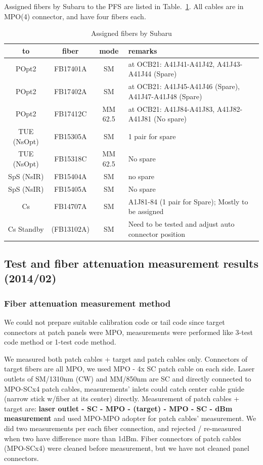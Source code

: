 \documentclass[a4paper,notitlepage]{article}
\begin{document}
Assigned fibers by Subaru to the PFS are listed 
in Table.~\ref{tab:subaru-fiber}.
All cables are in MPO(4) connector, and have four fibers each. 

\begin{table}[htb]
\begin{center}
\caption{Assigned fibers by Subaru}
\label{tab:subaru-fiber}
\begin{tabular}{c|c|c|l}
to & fiber & mode & remarks \\
\hline
POpt2 & FB17401A & SM & at OCB21: A41J41-A41J42, A41J43-A41J44 (Spare) \\
POpt2 & FB17402A & SM & at OCB21: A41J45-A41J46 (Spare), A41J47-A41J48 (Spare) \\
POpt2 & FB17412C & MM 62.5 & at OCB21: A41J84-A41J83, A41J82-A41J81 (No spare) \\
\hline
TUE (NsOpt) & FB15305A & SM & 1 pair for spare \\
TUE (NsOpt) & FB15318C & MM 62.5 & No spare \\
\hline
SpS (NsIR) & FB15404A & SM & no spare \\
SpS (NsIR) & FB15405A & SM & No spare \\
\hline
Cs & FB14707A & SM & A1J81-84 (1 pair for Spare); Mostly to be assigned \\
Cs Standby & (FB13102A) & SM & Need to be tested and adjust auto connector position
\end{tabular}
\end{center}
\end{table}

\subsection{Test and fiber attenuation measurement results (2014/02)} 

\subsubsection{Fiber attenuation measurement method}

We could not prepare suitable calibration code or tail code since 
target connectors at patch panels were MPO, measurements were performed 
like 3-test code method or 1-test code method. 

We measured both patch cables + target and patch cables only. 
Connectors of target fibers are all MPO, we used MPO - 4x SC patch cable on 
each side. Laser outlets of SM/1310nm (CW) and MM/850nm are SC and directly 
connected to MPO-SCx4 patch cables, 
measurements' inlets could catch center cable guide (narrow stick w/fiber 
at its center) directly.
Measurement of patch cables + target are:
{\bf laser outlet - SC - MPO - (target) - MPO - SC - dBm measurement} 
and used MPO-MPO adopter for patch cables' measurement.
We did two measurements per each fiber connection, and rejected / re-measured 
when two have difference more than 1dBm. 
Fiber connectors of patch cables (MPO-SCx4) were cleaned before measurement, 
but we have not cleaned panel connectors. 
\end{document}
